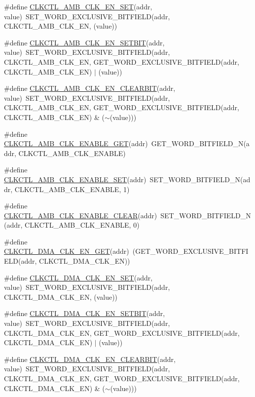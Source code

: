 \begin{DoxyCompactItemize}
\item 
\#define \hyperlink{a00544_afdff1dfa759a9bff44e6bb436f5f5dd3}{CLKCTL\_\-AMB\_\-CLK\_\-EN\_\-SET}(addr, value)~SET\_\-WORD\_\-EXCLUSIVE\_\-BITFIELD(addr, CLKCTL\_\-AMB\_\-CLK\_\-EN, (value))
\item 
\#define \hyperlink{a00544_aed0187d8e228df53d3b1b6e039be20eb}{CLKCTL\_\-AMB\_\-CLK\_\-EN\_\-SETBIT}(addr, value)~SET\_\-WORD\_\-EXCLUSIVE\_\-BITFIELD(addr, CLKCTL\_\-AMB\_\-CLK\_\-EN, GET\_\-WORD\_\-EXCLUSIVE\_\-BITFIELD(addr, CLKCTL\_\-AMB\_\-CLK\_\-EN) $|$ (value))
\item 
\#define \hyperlink{a00544_a1ee9938c0cae409c9c934abbaf5cbe52}{CLKCTL\_\-AMB\_\-CLK\_\-EN\_\-CLEARBIT}(addr, value)~SET\_\-WORD\_\-EXCLUSIVE\_\-BITFIELD(addr, CLKCTL\_\-AMB\_\-CLK\_\-EN, GET\_\-WORD\_\-EXCLUSIVE\_\-BITFIELD(addr, CLKCTL\_\-AMB\_\-CLK\_\-EN) \& ($\sim$(value)))
\item 
\#define \hyperlink{a00544_a2f20aa31c5d382b7d6024294a131fe7e}{CLKCTL\_\-AMB\_\-CLK\_\-ENABLE\_\-GET}(addr)~GET\_\-WORD\_\-BITFIELD\_\-N(addr, CLKCTL\_\-AMB\_\-CLK\_\-ENABLE)
\item 
\#define \hyperlink{a00544_a41012168a1dbaeb286cdccf0210f5bdc}{CLKCTL\_\-AMB\_\-CLK\_\-ENABLE\_\-SET}(addr)~SET\_\-WORD\_\-BITFIELD\_\-N(addr, CLKCTL\_\-AMB\_\-CLK\_\-ENABLE, 1)
\item 
\#define \hyperlink{a00544_a2b06bf2bfb6ddc8c2f5475000d79fcf8}{CLKCTL\_\-AMB\_\-CLK\_\-ENABLE\_\-CLEAR}(addr)~SET\_\-WORD\_\-BITFIELD\_\-N(addr, CLKCTL\_\-AMB\_\-CLK\_\-ENABLE, 0)
\item 
\#define \hyperlink{a00544_ae4a1b60e750930c940f6fa4f38a46a25}{CLKCTL\_\-DMA\_\-CLK\_\-EN\_\-GET}(addr)~(GET\_\-WORD\_\-EXCLUSIVE\_\-BITFIELD(addr, CLKCTL\_\-DMA\_\-CLK\_\-EN))
\item 
\#define \hyperlink{a00544_a630c199ed1a1f0d73d67c261c949d211}{CLKCTL\_\-DMA\_\-CLK\_\-EN\_\-SET}(addr, value)~SET\_\-WORD\_\-EXCLUSIVE\_\-BITFIELD(addr, CLKCTL\_\-DMA\_\-CLK\_\-EN, (value))
\item 
\#define \hyperlink{a00544_a7b4c2224db3254efe4a56db6eea78dff}{CLKCTL\_\-DMA\_\-CLK\_\-EN\_\-SETBIT}(addr, value)~SET\_\-WORD\_\-EXCLUSIVE\_\-BITFIELD(addr, CLKCTL\_\-DMA\_\-CLK\_\-EN, GET\_\-WORD\_\-EXCLUSIVE\_\-BITFIELD(addr, CLKCTL\_\-DMA\_\-CLK\_\-EN) $|$ (value))
\item 
\#define \hyperlink{a00544_af701fd810a36e9d4a2cecf199263c23d}{CLKCTL\_\-DMA\_\-CLK\_\-EN\_\-CLEARBIT}(addr, value)~SET\_\-WORD\_\-EXCLUSIVE\_\-BITFIELD(addr, CLKCTL\_\-DMA\_\-CLK\_\-EN, GET\_\-WORD\_\-EXCLUSIVE\_\-BITFIELD(addr, CLKCTL\_\-DMA\_\-CLK\_\-EN) \& ($\sim$(value)))

\end{DoxyCompactItemize}

